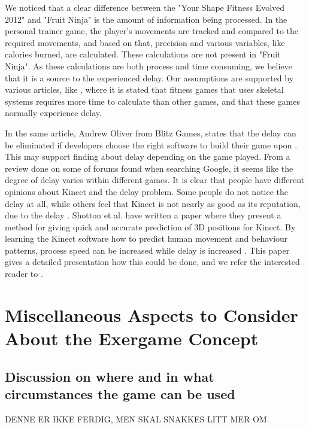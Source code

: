 We noticed that a clear difference between the "Your Shape Fitness Evolved 2012" and "Fruit Ninja" is the amount of information being processed. In the personal trainer game, the player's movements are tracked and compared to the required movements, and based on that, precision and various variables, like calories burned, are calculated. These calculations are not present in "Fruit Ninja". As these calculations are both process and time consuming, we believe that it is a source to the experienced delay. Our assumptions are supported by various articles, like \cite{kinectLag}, where it is stated that fitness games that uses skeletal systems requires more time to calculate than other games, and that these games normally experience delay. 

In the same article, Andrew Oliver from Blitz Games, states that the delay can be eliminated if developers choose the right software to build their game upon \cite{kinectLag}. This may support finding about delay depending on the game played. From a review done on some of forums found when searching Google, it seems like the degree of delay varies within different games. It is clear that people have different opinions about Kinect and the delay problem. Some people do not notice the delay at all, while others feel that Kinect is not nearly as good as its reputation, due to the delay \cite{kinectLagForum1} \cite{kinectLagForum2}. Shotton et al. have written a paper where they present a method for giving quick and accurate prediction of 3D positions for Kinect. By learning the Kinect software how to predict human movement and behaviour patterns, process speed can be increased while delay is increased \cite{artikkelKinectLag} \cite{artikkelKinectLagIntro}. This paper gives a detailed presentation how this could be done, and we refer the interested reader to \cite{artikkelKinectLag}.       

\section{Miscellaneous Aspects to Consider About the Exergame Concept}
\label{sec:misc}

\subsection{Discussion on where and in what circumstances the game can be used}
DENNE ER IKKE FERDIG, MEN SKAL SNAKKES LITT MER OM.
\label{subsec:whatwhere}

